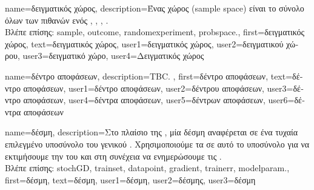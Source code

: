 {name={\foreignlanguage{greek}{δειγματικός χώρος}}, 
  	description={\foreignlanguage{greek}{Ένας}  
		\foreignlanguage{greek}{χώρος} (sample space) \foreignlanguage{greek}{είναι το σύνολο όλων των πιθανών} 
		 \foreignlanguage{greek}{ενός}  \cite{BillingsleyProbMeasure}, 
		\cite{BertsekasProb}, \cite{papoulis}, \cite{AshProbMeasure}. 
		\\
 		\foreignlanguage{greek}{Βλέπε επίσης:} \gls{sample}, \gls{outcome}, \gls{randomexperiment}, \gls{probspace}.},  
  	first={\foreignlanguage{greek}{δειγματικός χώρος}}, 
  	text={\foreignlanguage{greek}{δειγματικός χώρος}}, 
	user1={\foreignlanguage{greek}{δειγματικός χώρος}}, %
  	user2={\foreignlanguage{greek}{δειγματικού χώρου}}, %
	user3={\foreignlanguage{greek}{δειγματικό χώρο}}, %
	user4={\foreignlanguage{greek}{Δειγματικός χώρος}} %
}

{name={\foreignlanguage{greek}{δέντρο αποφάσεων}}, 
	description={TBC. },
	first={\foreignlanguage{greek}{δέντρο αποφάσεων}},
	text={\foreignlanguage{greek}{δέντρο αποφάσεων}},
	user1={\foreignlanguage{greek}{δέντρο αποφάσεων}}, %
	user2={\foreignlanguage{greek}{δέντρου αποφάσεων}}, %
	user3={\foreignlanguage{greek}{δέντρο αποφάσεων}}, %
	user4={\foreignlanguage{greek}{δέντρα αποφάσεων}}, %
	user5={\foreignlanguage{greek}{δέντρων αποφάσεων}}, %
	user6={\foreignlanguage{greek}{δέντρα αποφάσεων}} %
}

{name={\foreignlanguage{greek}{δέσμη}},
	description={\foreignlanguage{greek}{Στο πλαίσιο της} 
		, \foreignlanguage{greek}{μία δέσμη αναφέρεται σε ένα τυχαία επιλεγμένο υποσύνολο 
		του γενικού} . \foreignlanguage{greek}{Χρησιμοποιούμε τα}  
		\foreignlanguage{greek}{σε αυτό το υποσύνολο για να εκτιμήσουμε την} 
		 \foreignlanguage{greek}{του}  \foreignlanguage{greek}{και στη συνέχεια 
		να ενημερώσουμε τις} .
		\\
		\foreignlanguage{greek}{Βλέπε επίσης:} \gls{stochGD}, \gls{trainset}, \gls{datapoint}, \gls{gradient}, \gls{trainerr}, 
		\gls{modelparam}.}, 
	first={\foreignlanguage{greek}{δέσμη}},
	text={\foreignlanguage{greek}{δέσμη}},
	user1={\foreignlanguage{greek}{δέσμη}}, %
    	user2={\foreignlanguage{greek}{δέσμης}}, %
	user3={\foreignlanguage{greek}{δέσμη}} %
}

